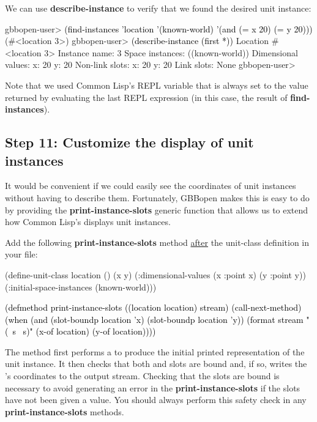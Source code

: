 \documentclass[10pt,twoside,english,pdftex]{article}
\begin{document}
%
%
We can use \textbf{describe-instance} to verify that we found the desired
 unit instance:
%
\W\supp
\begin{example}
\textcolor{darkergray}{%
  gbbopen-user> \textcolor{black}{(find-instances 'location '(known-world)
                  '(and (= x 20) (= y 20)))}
   (#<location 3>)
  gbbopen-user> \textcolor{black}{(describe-instance (first *))}
  Location #<location 3>
    Instance name: 3
    Space instances: ((known-world))
    Dimensional values:
      x:  20
      y:  20
    Non-link slots:
      x:  20
      y:  20
    Link slots: None
  gbbopen-user>}
\end{example}
%
Note that we used Common Lisp's REPL \code{*} variable that is always set to
the value returned by evaluating the last REPL expression (in this case, the
result of \textbf{find-instances}).

\subsection*{Step 11: Customize the display of  unit instances}

It would be convenient if we could easily see the coordinates of
 unit instances without having to describe them.  Fortunately,
GBBopen makes this is easy to do by providing the
\textbf{print-instance-slots} generic function that allows us to extend how
Common Lisp's  displays  unit instances.

%
%
Add the following \textbf {print-instance-slots} method \underline{after} the
 unit-class definition in your 
file:
%
\W\supp
\begin{example}
\textcolor{darkergray}{%
  (define-unit-class location ()
    (x y)
    (:dimensional-values
      (x :point x)
      (y :point y))
    (:initial-space-instances (known-world)))

  \textcolor{black}{(defmethod print-instance-slots ((location location) stream)
    (call-next-method)
    (when (and (slot-boundp location 'x)
               (slot-boundp location 'y))
      (format stream " (~s ~s)"
              (x-of location)
              (y-of location))))}}
\end{example}
%
The method first performs a  to produce the initial
printed representation of the  unit instance.  It then checks
that both  and  slots are bound and, if so, writes the
's coordinates to the output stream.  Checking that the slots
are bound is necessary to avoid generating an error in the
\textbf{print-instance-slots} if the slots have not been given a value.  You
should always perform this safety check in any \textbf{print-instance-slots}
methods.
\end{document}
